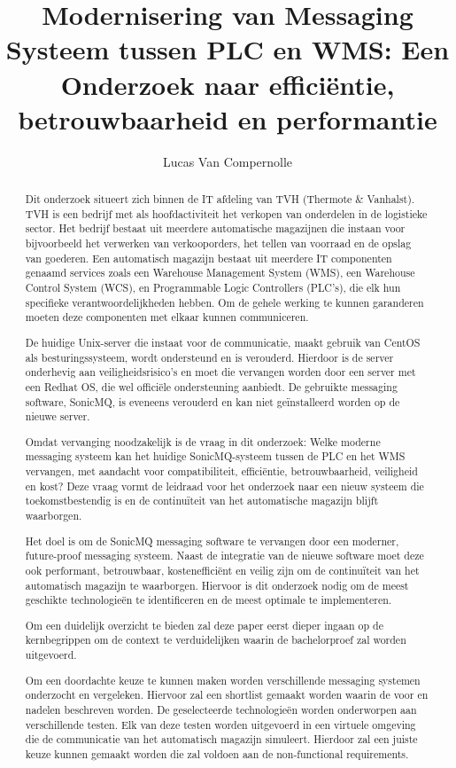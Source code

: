 \documentclass{hogent-article}
\title{Modernisering van Messaging Systeem tussen PLC en WMS: Een Onderzoek naar efficiëntie, betrouwbaarheid en performantie}
\author{Lucas Van Compernolle}
\begin{document}
\begin{abstract}

Dit onderzoek situeert zich binnen de IT afdeling van TVH (Thermote \& Vanhalst). 
TVH is een bedrijf met als hoofdactiviteit het verkopen van onderdelen in de logistieke sector.
Het bedrijf bestaat uit meerdere automatische magazijnen die instaan voor bijvoorbeeld het verwerken van verkooporders, 
het tellen van voorraad en de opslag van goederen. 
Een automatisch magazijn bestaat uit meerdere IT componenten genaamd services zoals
een Warehouse Management System (WMS), een Warehouse Control System (WCS), en Programmable Logic Controllers (PLC's), die elk hun specifieke verantwoordelijkheden hebben. 
Om de gehele werking te kunnen garanderen moeten deze componenten met elkaar kunnen communiceren. 
\newline

De huidige Unix-server die instaat voor de communicatie, maakt gebruik van CentOS als besturingssysteem,
wordt ondersteund en is verouderd.
Hierdoor is de server onderhevig aan veiligheidsrisico's en moet die vervangen worden door een server met een Redhat OS, die wel officiële ondersteuning aanbiedt.
De gebruikte messaging software, SonicMQ, is eveneens verouderd en kan niet geïnstalleerd worden op de nieuwe server. 

Omdat vervanging noodzakelijk is de vraag in dit onderzoek: 
Welke moderne messaging systeem kan het huidige SonicMQ-systeem tussen de PLC en het WMS vervangen, 
met aandacht voor compatibiliteit, efficiëntie, betrouwbaarheid, veiligheid en kost?
Deze vraag vormt de leidraad voor het onderzoek naar een nieuw systeem die toekomstbestendig is 
en de continuïteit van het automatische magazijn blijft waarborgen.
\newline

Het doel is om de SonicMQ messaging software te vervangen door een moderner, future-proof messaging systeem.
Naast de integratie van de nieuwe software moet deze ook performant, betrouwbaar, kostenefficiënt en veilig zijn 
om de continuïteit van het automatisch magazijn te waarborgen. 
Hiervoor is dit onderzoek nodig om de meest geschikte technologieën te identificeren en de meest optimale te implementeren.
\newline

Om een duidelijk overzicht te bieden zal deze paper eerst dieper ingaan op de kernbegrippen 
om de context te verduidelijken waarin de bachelorproef zal worden uitgevoerd.

Om een doordachte keuze te kunnen maken worden verschillende messaging systemen onderzocht en vergeleken. 
Hiervoor zal een shortlist gemaakt worden waarin de voor en nadelen beschreven worden.
De geselecteerde technologieën worden onderworpen aan verschillende testen.
Elk van deze testen worden uitgevoerd in een virtuele omgeving die de communicatie van het automatisch magazijn simuleert. 
Hierdoor zal een juiste keuze kunnen gemaakt worden die zal voldoen aan de non-functional requirements.

\end{abstract}

\tableofcontents




\printbibliography[heading=bibintoc]
\end{document}
